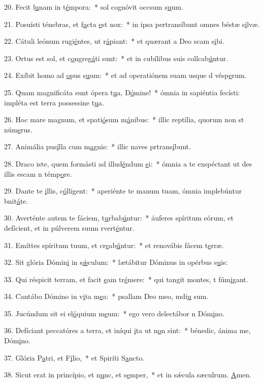 20. Fecit l\uline{u}nam in t\uline{é}mpora:~* sol cognóvit occsum s\uline{u}um.\par 
21. Posuísti ténebras, et f\uline{a}cta \uline{e}st nox:~* in ipsa pertransíbunt omnes béstæ s\uline{i}lvæ.\par 
22. Cátuli leónum rugi\uline{é}ntes, ut r\uline{á}piant:~* et quærant a Deo scam s\uline{i}bi.\par 
23. Ortus est sol, et c\uline{o}ngreg\uline{á}ti sunt:~* et in cubílibus suis collcab\uline{ú}ntur.\par 
24. Exíbit homo ad \uline{o}pus s\uline{u}um:~* et ad operatiónem suam usque d vésp\uline{e}rum.\par 
25. Quam magnificáta sunt ópera t\uline{u}a, D\uline{ó}mine!~* ómnia in sapiéntia fecísti: impléta est terra possessine t\uline{u}a.\par 
26. Hoc mare magnum, et spati\uline{ó}sum m\uline{á}nibus:~* illic reptília, quorum non st núm\uline{e}rus.\par 
27. Animália pus\uline{í}lla cum m\uline{a}gnis:~* illic naves prtrans\uline{í}bunt.\par 
28. Draco iste, quem formásti ad illud\uline{é}ndum \uline{e}i:~* ómnia a te exspéctant ut des illis escam n témp\uline{o}re.\par 
29. Dante te \uline{i}llis, c\uline{ó}lligent:~* aperiénte te manum tuam, ómnia implebúntur bnit\uline{á}te.\par 
30. Averténte autem te fáciem, t\uline{u}rbab\uline{ú}ntur:~* áuferes spíritum eórum, et defícient, et in púlverem suum rvert\uline{é}ntur.\par 
31. Emíttes spíritum tuum, et cr\uline{e}ab\uline{ú}ntur:~* et renovábis fácem t\uline{e}rræ.\par 
32. Sit glória Dómin\uline{i} in s\uline{ǽ}culum:~* lætábitur Dóminus in opérbus s\uline{u}is:\par 
33. Qui réspicit terram, et facit \uline{e}am tr\uline{é}mere:~* qui tangit montes, t fúm\uline{i}gant.\par 
34. Cantábo Dómino in v\uline{i}ta m\uline{e}a:~* psallam Deo meo, mdi\uline{u} sum.\par 
35. Jucúndum sit ei el\uline{ó}quium m\uline{e}um:~* ego vero delectábor n Dóm\uline{i}no.\par 
36. Defíciant peccatóres a terra, et iníqui \uline{i}ta ut n\uline{o}n sint:~* bénedic, ánima me, Dóm\uline{i}no.\par 
37. Glória P\uline{a}tri, et F\uline{í}lio,~* et Spiríti S\uline{a}ncto.\par 
38. Sicut erat in princípio, et n\uline{u}nc, et s\uline{e}mper,~* et in sǽcula sæculrum. \uline{A}men.\par 

